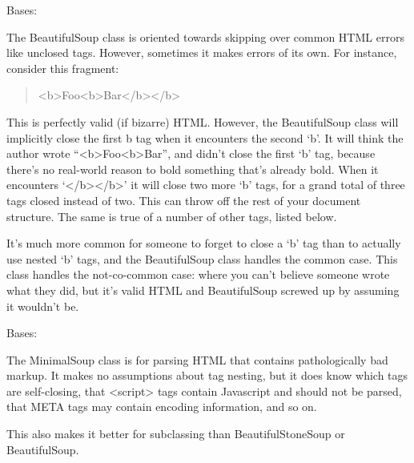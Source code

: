 \documentclass[letterpaper,10pt,english]{sphinxmanual}
\begin{document}
\begin{fulllineitems}
\label{SamPy.parsing:SamPy.parsing.BeautifulSoup.ICantBelieveItsBeautifulSoup}
Bases: {\hyperref[SamPy.parsing:SamPy.parsing.BeautifulSoup.BeautifulSoup]{}}

The BeautifulSoup class is oriented towards skipping over
common HTML errors like unclosed tags. However, sometimes it makes
errors of its own. For instance, consider this fragment:
\begin{quote}

\textless{}b\textgreater{}Foo\textless{}b\textgreater{}Bar\textless{}/b\textgreater{}\textless{}/b\textgreater{}
\end{quote}

This is perfectly valid (if bizarre) HTML. However, the
BeautifulSoup class will implicitly close the first b tag when it
encounters the second `b'. It will think the author wrote
``\textless{}b\textgreater{}Foo\textless{}b\textgreater{}Bar'', and didn't close the first `b' tag, because
there's no real-world reason to bold something that's already
bold. When it encounters `\textless{}/b\textgreater{}\textless{}/b\textgreater{}' it will close two more `b'
tags, for a grand total of three tags closed instead of two. This
can throw off the rest of your document structure. The same is
true of a number of other tags, listed below.

It's much more common for someone to forget to close a `b' tag
than to actually use nested `b' tags, and the BeautifulSoup class
handles the common case. This class handles the not-co-common
case: where you can't believe someone wrote what they did, but
it's valid HTML and BeautifulSoup screwed up by assuming it
wouldn't be.

\end{fulllineitems}



\begin{fulllineitems}
\label{SamPy.parsing:SamPy.parsing.BeautifulSoup.MinimalSoup}
Bases: {\hyperref[SamPy.parsing:SamPy.parsing.BeautifulSoup.BeautifulSoup]{}}

The MinimalSoup class is for parsing HTML that contains
pathologically bad markup. It makes no assumptions about tag
nesting, but it does know which tags are self-closing, that
\textless{}script\textgreater{} tags contain Javascript and should not be parsed, that
META tags may contain encoding information, and so on.

This also makes it better for subclassing than BeautifulStoneSoup
or BeautifulSoup.

\end{fulllineitems}
\end{document}
